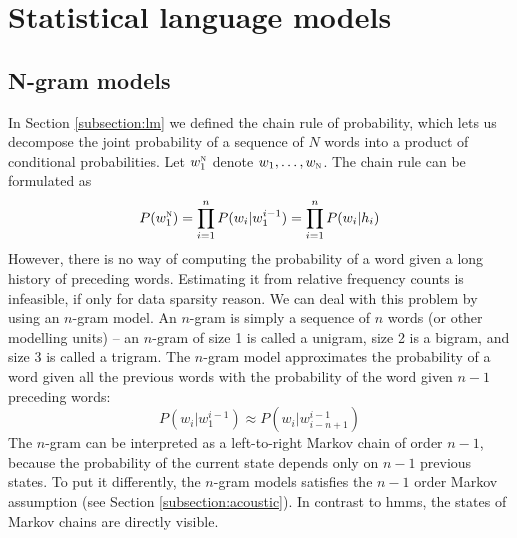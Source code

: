 \chapter{Statistical language models}
\label{chapter:lm}

\section{N-gram models}
\label{section:ngrams}
In Section \ref{subsection:lm} we defined the chain rule of probability, which lets us decompose the joint probability of a sequence of $N$ words into a product of conditional probabilities. Let $w_{1}^{\textsc{n}}$ denote $w_{1}, \dots, w_{\textsc{n}}$. The chain rule can be formulated as
\begin{equation}
	\label{equation:chain}
	P(w_{1}^{\textsc{n}})=\prod_{i=1}^{n}P(w_{i}|w_{1}^{i-1})=\prod_{i=1}^{n}P(w_{i}|h_{i})
\end{equation}
However, there is no way of computing the probability of a word given a long history of preceding words. Estimating it from relative frequency counts is infeasible, if only for data sparsity reason. We can deal with this problem by using an $n$-gram model. An $n$-gram is simply a sequence of $n$ words (or other modelling units) -- an $n$-gram of size 1 is called a unigram, size 2 is a bigram, and size 3 is called a trigram. The $n$-gram model approximates the probability of a word given all the previous words with the probability of the word given $n-1$ preceding words:
\begin{equation}
	P(w_{i}|w_{1}^{i-1})\approx P(w_{i}|w_{i-n+1}^{i-1})
\end{equation}
The $n$-gram can be interpreted as a left-to-right Markov chain of order $n-1$, because the probability of the current state depends only on $n-1$ previous states. To put it differently, the $n$-gram models satisfies the $n-1$ order Markov assumption (see Section \ref{subsection:acoustic}). In contrast to \glspl{hmm}, the states of Markov chains are directly visible.

